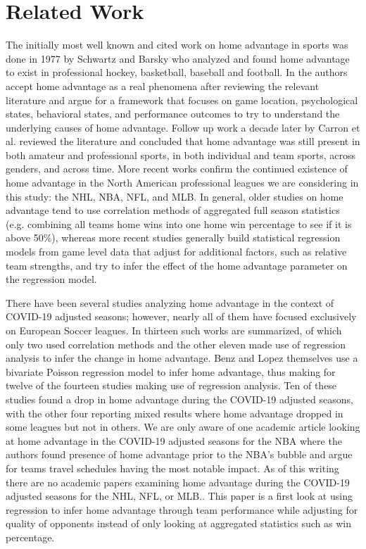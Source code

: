 \section{Related Work}

The initially most well known and cited work on home advantage in sports was done in 1977 by Schwartz and Barsky \cite{Schwartz1977} who analyzed and found home advantage to exist in professional hockey, basketball, baseball and football. In \cite{Courneya1992} the authors accept home advantage as a real phenomena after reviewing the relevant literature and argue for a framework that focuses on game location, psychological states, behavioral states, and performance outcomes to try to understand the underlying causes of home advantage. Follow up work a decade later by Carron et al. \cite{Carron2005} reviewed the literature and concluded that home advantage was still present in both amateur and professional sports, in both individual and team sports, across genders, and across time. More recent works \cite{Pollard2005a} \cite{Gomez2011} confirm the continued existence of home advantage in the North American professional leagues we are considering in this study: the NHL, NBA, NFL, and MLB. In general, older studies on home advantage tend to use correlation methods of aggregated full season statistics (e.g. combining all teams home wins into one home win percentage to see if it is above 50\%), whereas more recent studies generally build statistical regression models from game level data that adjust for additional factors, such as relative team strengths, and try to infer the effect of the home advantage parameter on the regression model.

There have been several studies analyzing home advantage in the context of COVID-19 adjusted seasons; however, nearly all of them have focused exclusively on European Soccer leagues. In \cite{Benz2020} thirteen such works are summarized, of which only two used correlation methods and the other eleven made use of regression analysis to infer the change in home advantage. Benz and Lopez themselves use a bivariate Poisson regression model to infer home advantage, thus making for twelve of the fourteen studies making use of regression analysis. Ten of these studies found a drop in home advantage during the COVID-19 adjusted seasons, with the other four reporting mixed results where home advantage dropped in some leagues but not in others. We are only aware of one academic article looking at home advantage in the COVID-19 adjusted seasons for the NBA \cite{McHill2020} where the authors found presence of home advantage prior to the NBA's bubble and argue for teams travel schedules having the most notable impact. As of this writing there are no academic papers examining home advantage during the COVID-19 adjusted seasons for the NHL, NFL, or MLB.. This paper is a first look at using regression to infer home advantage through team performance while adjusting for quality of opponents instead of only looking at aggregated statistics such as win percentage.


